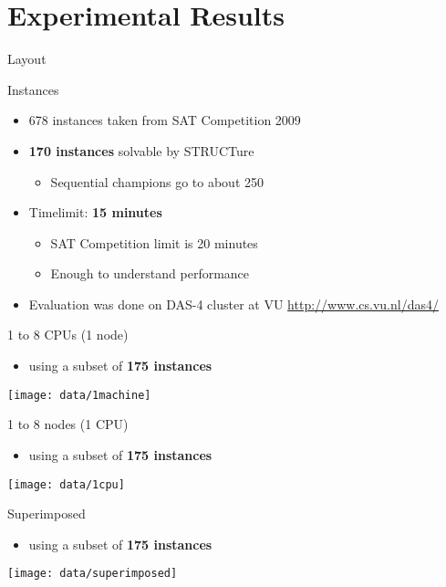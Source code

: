 \documentclass[mathserif,serif]{beamer}
\begin{document}
\section{Experimental Results}

\begin{frame}{Layout}
  \tableofcontents[currentsection]
\end{frame}

\begin{frame}{Instances}
    \begin{itemize}
      \item 678 instances taken from SAT Competition 2009
      \item \textbf{170 instances} solvable by STRUCTure
      \begin{itemize}
        \item Sequential champions go to about 250
      \end{itemize}
      \item Timelimit: \textbf{15 minutes}
      \begin{itemize}
        \item SAT Competition limit is 20 minutes
        \item Enough to understand performance
      \end{itemize}

      \item Evaluation was done on DAS-4 cluster at VU
      \url{http://www.cs.vu.nl/das4/}
    \end{itemize}
\end{frame}

\begin{frame}{1 to 8 CPUs (1 node)}
  \begin{itemize}
    \item using a subset of \textbf{175 instances}
  \end{itemize}
  \centering
  \texttt{[image: data/1machine]}
\end{frame}

\begin{frame}{1 to 8 nodes (1 CPU)}
  \begin{itemize}
    \item using a subset of \textbf{175 instances}
  \end{itemize}
  \centering
  \texttt{[image: data/1cpu]}
\end{frame}

\begin{frame}{Superimposed}
  \begin{itemize}
    \item using a subset of \textbf{175 instances}
  \end{itemize}
  \centering
  \texttt{[image: data/superimposed]}
\end{frame}
\end{document}
